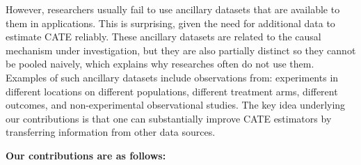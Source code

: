However, researchers usually fail to use ancillary datasets that are available to them in applications. This is surprising, given the need for additional data to estimate CATE reliably. These ancillary datasets are related to the causal mechanism under investigation, but they are also partially distinct so they cannot be pooled naively, which explains why researches often do not use them. Examples of such ancillary datasets include observations from: experiments in different locations on different populations, different treatment arms, different outcomes, and non-experimental observational studies. The key idea underlying our contributions is that one can substantially improve CATE estimators by transferring information from other data sources.

\textbf{Our contributions are as follows:}

